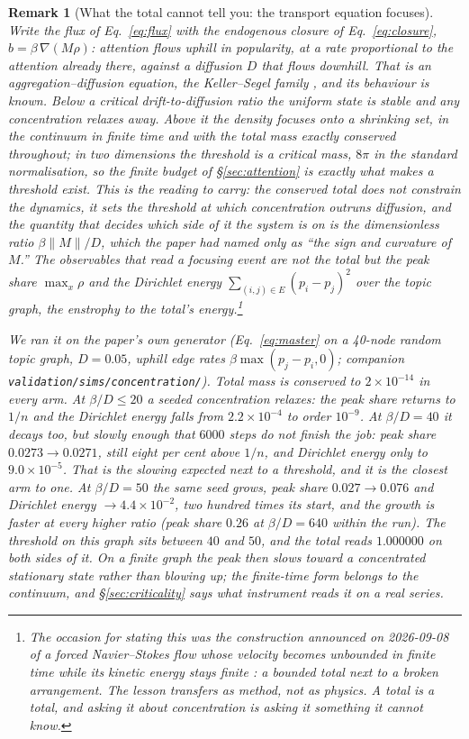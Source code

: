 \documentclass[11pt]{article}
\newtheorem{remark}{Remark}
\begin{document}
\begin{remark}[What the total cannot tell you: the transport equation focuses]
\label{rem:focusing}
Write the flux of Eq.~\eqref{eq:flux} with the endogenous closure of Eq.~\eqref{eq:closure}, $b = \beta\,\nabla(M\rho)$: attention flows uphill in popularity, at a rate proportional to the attention already there, against a diffusion $D$ that flows downhill. That is an aggregation--diffusion equation, the Keller--Segel family \cite{kellersegel1970,jagerluckhaus1992,blanchet2006}, and its behaviour is known. Below a critical drift-to-diffusion ratio the uniform state is stable and any concentration relaxes away. Above it the density focuses onto a shrinking set, in the continuum in finite time and with the total mass exactly conserved throughout; in two dimensions the threshold is a critical \emph{mass}, $8\pi$ in the standard normalisation, so the finite budget of \S\ref{sec:attention} is exactly what makes a threshold exist. This is the reading to carry: the conserved total does not constrain the dynamics, it sets the threshold at which concentration outruns diffusion, and the quantity that decides which side of it the system is on is the dimensionless ratio $\beta\lVert M\rVert / D$, which the paper had named only as ``the sign and curvature of $M$.'' The observables that read a focusing event are not the total but the peak share $\max_x \rho$ and the Dirichlet energy $\sum_{(i,j)\in E}(p_i-p_j)^2$ over the topic graph, the enstrophy to the total's energy.\footnote{The occasion for stating this was the construction announced on 2026-09-08 of a forced Navier--Stokes flow whose velocity becomes unbounded in finite time while its kinetic energy stays finite \cite{openai2026ns}: a bounded total next to a broken arrangement. The lesson transfers as method, not as physics. A total is a total, and asking it about concentration is asking it something it cannot know.}

We ran it on the paper's own generator (Eq.~\eqref{eq:master} on a 40-node random topic graph, $D=0.05$, uphill edge rates $\beta\max(p_j-p_i,0)$; companion \texttt{validation/sims/concentration/}). Total mass is conserved to $2\times10^{-14}$ in every arm. At $\beta/D \le 20$ a seeded concentration relaxes: the peak share returns to $1/n$ and the Dirichlet energy falls from $2.2\times10^{-4}$ to order $10^{-9}$. At $\beta/D = 40$ it decays too, but slowly enough that $6000$ steps do not finish the job: peak share $0.0273 \to 0.0271$, still eight per cent above $1/n$, and Dirichlet energy only to $9.0\times10^{-5}$. That is the slowing expected next to a threshold, and it is the closest arm to one. At $\beta/D = 50$ the same seed grows, peak share $0.027 \to 0.076$ and Dirichlet energy $\to 4.4\times10^{-2}$, two hundred times its start, and the growth is faster at every higher ratio (peak share $0.26$ at $\beta/D=640$ within the run). The threshold on this graph sits between $40$ and $50$, and the total reads $1.000000$ on both sides of it. On a finite graph the peak then slows toward a concentrated stationary state rather than blowing up; the finite-time form belongs to the continuum, and \S\ref{sec:criticality} says what instrument reads it on a real series.
\end{remark}
\end{document}
